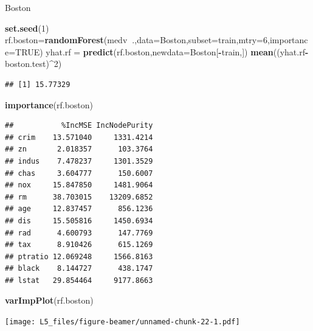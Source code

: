 \documentclass[
  ignorenonframetext,
]{beamer}
\newenvironment{Shaded}{\begin{snugshade}}{\end{snugshade}}
\newcommand{\DataTypeTok}[1]{\textcolor[rgb]{0.13,0.29,0.53}{#1}}
\newcommand{\DecValTok}[1]{\textcolor[rgb]{0.00,0.00,0.81}{#1}}
\newcommand{\KeywordTok}[1]{\textcolor[rgb]{0.13,0.29,0.53}{\textbf{#1}}}
\newcommand{\NormalTok}[1]{#1}
\newcommand{\OperatorTok}[1]{\textcolor[rgb]{0.81,0.36,0.00}{\textbf{#1}}}
\newcommand{\OtherTok}[1]{\textcolor[rgb]{0.56,0.35,0.01}{#1}}
\newcommand{\StringTok}[1]{\textcolor[rgb]{0.31,0.60,0.02}{#1}}
\begin{document}
\begin{frame}[fragile]

\begin{block}{Boston}

\begin{Shaded}
\begin{Highlighting}[]
\KeywordTok{set.seed}\NormalTok{(}\DecValTok{1}\NormalTok{)}
\NormalTok{rf.boston=}\KeywordTok{randomForest}\NormalTok{(medv}\OperatorTok{~}\NormalTok{.,}\DataTypeTok{data=}\NormalTok{Boston,}\DataTypeTok{subset=}\NormalTok{train,}\DataTypeTok{mtry=}\DecValTok{6}\NormalTok{,}\DataTypeTok{importance=}\OtherTok{TRUE}\NormalTok{)}
\NormalTok{yhat.rf =}\StringTok{ }\KeywordTok{predict}\NormalTok{(rf.boston,}\DataTypeTok{newdata=}\NormalTok{Boston[}\OperatorTok{-}\NormalTok{train,])}
\KeywordTok{mean}\NormalTok{((yhat.rf}\OperatorTok{-}\NormalTok{boston.test)}\OperatorTok{^}\DecValTok{2}\NormalTok{)}
\end{Highlighting}
\end{Shaded}

\begin{verbatim}
## [1] 15.77329
\end{verbatim}

\begin{Shaded}
\begin{Highlighting}[]
\KeywordTok{importance}\NormalTok{(rf.boston)}
\end{Highlighting}
\end{Shaded}

\begin{verbatim}
##           %IncMSE IncNodePurity
## crim    13.571040     1331.4214
## zn       2.018357      103.3764
## indus    7.478237     1301.3529
## chas     3.604777      150.6007
## nox     15.847850     1481.9064
## rm      38.703015    13209.6852
## age     12.837457      856.1236
## dis     15.505816     1450.6934
## rad      4.600793      147.7769
## tax      8.910426      615.1269
## ptratio 12.069248     1566.8163
## black    8.144727      438.1747
## lstat   29.854464     9177.8663
\end{verbatim}

\begin{Shaded}
\begin{Highlighting}[]
\KeywordTok{varImpPlot}\NormalTok{(rf.boston)}
\end{Highlighting}
\end{Shaded}

\texttt{[image: L5\_files/figure-beamer/unnamed-chunk-22-1.pdf]}

\end{block}

\end{frame}
\end{document}

